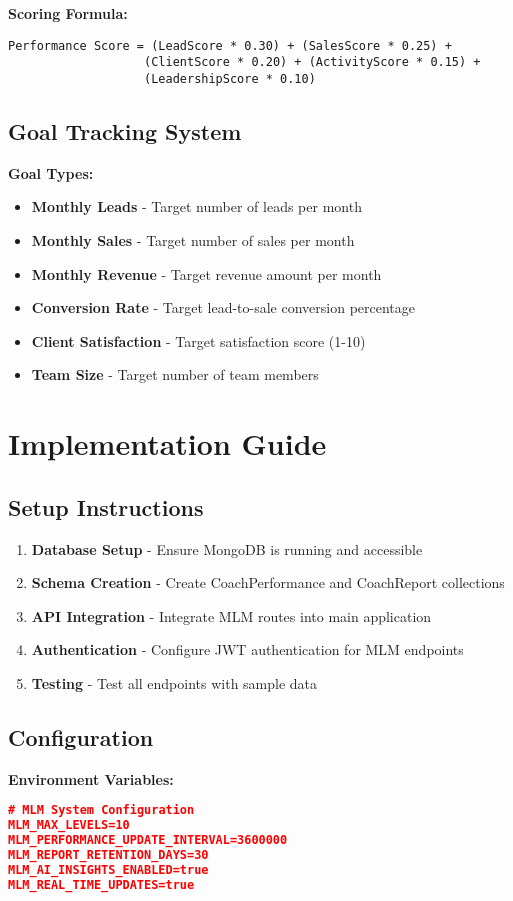 \documentclass[12pt,a4paper]{article}
\newcommand{\samplecode}[1]{\begin{lstlisting}[language=JSON]#1\end{lstlisting}}
\begin{document}
\textbf{Scoring Formula:}
\begin{lstlisting}
Performance Score = (LeadScore * 0.30) + (SalesScore * 0.25) + 
                   (ClientScore * 0.20) + (ActivityScore * 0.15) + 
                   (LeadershipScore * 0.10)
\end{lstlisting}

\subsection{Goal Tracking System}
\textbf{Goal Types:}
\begin{itemize}
    \item \textbf{Monthly Leads} - Target number of leads per month
    \item \textbf{Monthly Sales} - Target number of sales per month
    \item \textbf{Monthly Revenue} - Target revenue amount per month
    \item \textbf{Conversion Rate} - Target lead-to-sale conversion percentage
    \item \textbf{Client Satisfaction} - Target satisfaction score (1-10)
    \item \textbf{Team Size} - Target number of team members
\end{itemize}

\section{Implementation Guide}

\subsection{Setup Instructions}
\begin{enumerate}
    \item \textbf{Database Setup} - Ensure MongoDB is running and accessible
    \item \textbf{Schema Creation} - Create CoachPerformance and CoachReport collections
    \item \textbf{API Integration} - Integrate MLM routes into main application
    \item \textbf{Authentication} - Configure JWT authentication for MLM endpoints
    \item \textbf{Testing} - Test all endpoints with sample data
\end{enumerate}

\subsection{Configuration}
\textbf{Environment Variables:}
\samplecode{
# MLM System Configuration
MLM_MAX_LEVELS=10
MLM_PERFORMANCE_UPDATE_INTERVAL=3600000
MLM_REPORT_RETENTION_DAYS=30
MLM_AI_INSIGHTS_ENABLED=true
MLM_REAL_TIME_UPDATES=true
}
\end{document}
